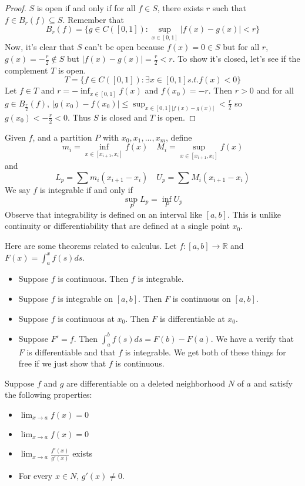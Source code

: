 \documentclass{article}
\newcommand{\R}{\mathbb{R}}
\newcommand{\ra}[1][]{\xrightarrow{#1}}
\begin{document}
\begin{proof}
  $S$ is open if and only if for all $f\in S$, there exists $r$ such that $f\in B_r(f)\subseteq S$. Remember that
  $$
  B_r(f)=\{g\in C([0,1]):\sup_{x\in[0,1]}|f(x)-g(x)|<r\}
  $$
  Now, it's clear that $S$ can't be open because $f(x)=0\in S$ but for all $r$, $g(x)=-\frac{r}{2}\notin S$ but $|f(x)-g(x)|=\frac{r}{2}<r$. To show it's closed, let's see if the complement $T$ is open.
  $$
  T=\{f\in C([0,1]):\exists x\in[0,1] s.t. f(x)<0\}
  $$
  Let $f\in T$ and $r=-\inf_{x\in[0,1]}f(x)$ and $f(x_0)=-r$. Then $r>0$ and for all $g\in B_\frac{r}{2}(f)$, $|g(x_0)-f(x_0)|\leq\sup_{x\in[0,1]|f(x)-g(x)|}<\frac{r}{2}$ so $g(x_0)<-\frac{r}{2}<0$.
  Thus $S$ is closed and $T$ is open.
\end{proof}
\begin{definition}
  Given $f$, and a partition $P$ with $x_0,x_1,...,x_m$, define
  $$
  m_i=\inf_{x\in[x_{i+1},x_i]}f(x)\quad M_i=\sup_{x\in[x_{i+1},x_i]}f(x)
  $$
  and
  $$
  L_p=\sum m_i(x_{i+1}-x_i)\quad U_p=\sum M_i(x_{i+1}-x_i)
  $$
  We say $f$ is integrable if and only if
  $$
  \sup_P L_p=\inf_P U_p
  $$
  Observe that integrability is defined on an interval like $[a,b]$. This is unlike continuity or differentiability that are defined at a single point $x_0$.
\end{definition}
\begin{theorem}[Calculus]
  Here are some theorems related to calculus. Let $f:[a,b]\ra \R$ and $F(x)=\int_a^xf(s)ds$.
  \begin{itemize}
    \item Suppose $f$ is continuous. Then $f$ is integrable.
    \item Suppose $f$ is integrable on $[a,b]$. Then $F$ is continuous on $[a,b]$.
    \item Suppose $f$ is continuous at $x_0$. Then $F$ is differentiable at $x_0$.
    \item Suppose $F'=f$. Then $\int_a^bf(s)ds=F(b)-F(a)$. We have a verify that $F$ is differentiable and that $f$ is integrable. We get both of these things for free if we just show that $f$ is continuous.
  \end{itemize}
\end{theorem}
\begin{theorem}
  Suppose $f$ and $g$ are differentiable on a deleted neighborhood $N$ of $a$ and satisfy the following properties:
  \begin{itemize}
    \item $\lim_{x\to a}f(x)=0$
    \item $\lim_{x\to a}f(x)=0$
    \item $\lim_{x\to a}\frac{f'(x)}{g'(x)}$ exists
    \item For every $x\in N$, $g'(x)\neq 0$.
  \end{itemize}
\end{theorem}
\end{document}
